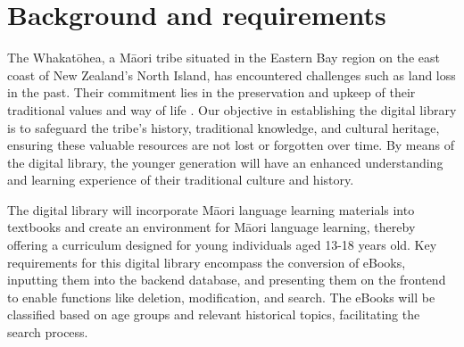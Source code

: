 \chapter{Background and requirements}

The Whakatōhea, a Māori tribe situated in the Eastern Bay region on the east coast of New Zealand's North Island, has encountered challenges such as land loss in the past. Their commitment lies in the preservation and upkeep of their traditional values and way of life \autocite{Whakatoh25:online}. Our objective in establishing the digital library is to safeguard the tribe's history, traditional knowledge, and cultural heritage, ensuring these valuable resources are not lost or forgotten over time. By means of the digital library, the younger generation will have an enhanced understanding and learning experience of their traditional culture and history.

The digital library will incorporate Māori language learning materials into textbooks and create an environment for Māori language learning, thereby offering a curriculum designed for young individuals aged 13-18 years old. Key requirements for this digital library encompass the conversion of eBooks, inputting them into the backend database, and presenting them on the frontend to enable functions like deletion, modification, and search. The eBooks will be classified based on age groups and relevant historical topics, facilitating the search process.
